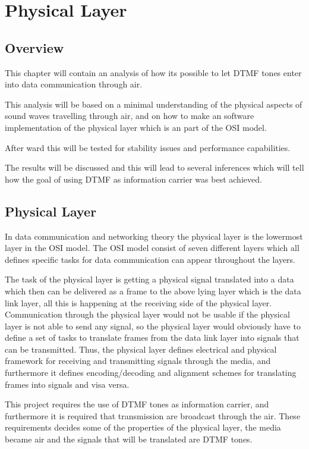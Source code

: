 \section{Physical Layer}

	\subsection{Overview}
	This chapter will contain an analysis of how its possible to let DTMF tones
	enter into data communication through air.
	
	This analysis will be based on a minimal understanding of the physical aspects
	of sound waves travelling through air, and on how to make an software
	implementation of the physical layer which is an part of the OSI model.
	
	After ward this will be tested for stability issues and performance capabilities.
	
	The results will be discussed and this will lead to several inferences which will
	tell how the goal of using DTMF as information carrier was best achieved.

	\subsection{Physical Layer}
	In data communication and networking theory the physical layer is the lowermost
	layer in the OSI model. The OSI model consist of seven different layers which all
	defines specific tasks for data communication can appear throughout the layers.
	
	The task of the physical layer is getting a physical signal translated into a data which
	then can be delivered as a frame to the above lying layer which is the data link layer,
	all this is happening at the receiving side of the physical layer. Communication through
	the physical layer would not be usable if the physical layer is not able to send any signal,
	so the physical layer would obviously have to define a set of tasks to translate frames from
	the data link layer into signals that can be transmitted. Thus, the physical layer defines
	electrical and physical framework for receiving and transmitting signals through the media,
	and furthermore it defines encoding/decoding and alignment schemes for translating
	frames into signals and visa versa.
	
	This project requires the use of DTMF tones as information carrier, and furthermore it is
	required that transmission are broadcast through the air. These requirements decides some
	of the properties of the physical layer, the media became air and the signals that will be
	translated are DTMF tones.
	
